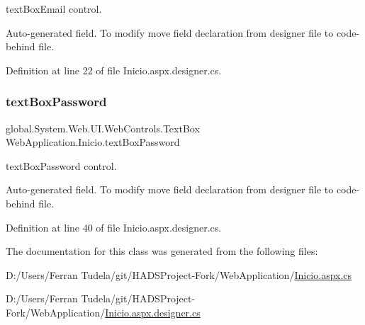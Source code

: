 text\+Box\+Email control. 

Auto-\/generated field. To modify move field declaration from designer file to code-\/behind file. 

Definition at line 22 of file Inicio.\+aspx.\+designer.\+cs.

\mbox{\label{classWebApplication_1_1Inicio_a0cff7e27599760cdcf05565f5eaa54e5}} 
\subsubsection{\texorpdfstring{textBoxPassword}{textBoxPassword}}
{\footnotesize\ttfamily global.\+System.\+Web.\+U\+I.\+Web\+Controls.\+Text\+Box Web\+Application.\+Inicio.\+text\+Box\+Password\hspace{0.3cm}{\ttfamily [protected]}}



text\+Box\+Password control. 

Auto-\/generated field. To modify move field declaration from designer file to code-\/behind file. 

Definition at line 40 of file Inicio.\+aspx.\+designer.\+cs.



The documentation for this class was generated from the following files\+:\begin{DoxyCompactItemize}
\item 
D\+:/\+Users/\+Ferran Tudela/git/\+H\+A\+D\+S\+Project-\/\+Fork/\+Web\+Application/\mbox{\hyperlink{Inicio_8aspx_8cs}{Inicio.\+aspx.\+cs}}\item 
D\+:/\+Users/\+Ferran Tudela/git/\+H\+A\+D\+S\+Project-\/\+Fork/\+Web\+Application/\mbox{\hyperlink{Inicio_8aspx_8designer_8cs}{Inicio.\+aspx.\+designer.\+cs}}\end{DoxyCompactItemize}
